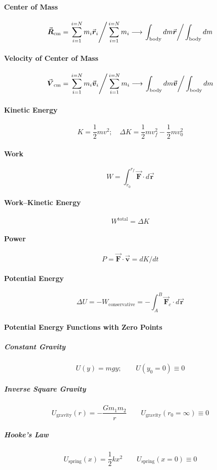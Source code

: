\documentclass{article}
\let\oldvec=\vec
\renewcommand{\vec}[1]{\oldvec{\boldsymbol{#1}}}
\begin{document}
\begin{multicols}{2}
  \paragraph{Center of Mass}
    $$\vec R_\text{cm} = \left.\sum_{i = 1}^{i=N} m_i \vec r_i \right/ \sum_{i=1}^{i=N} m_i \longrightarrow \left. \int_\text{body} dm\vec r \right/ \int_\text{body} dm$$
   
  \paragraph{Velocity of Center of Mass}
    $$\vec V_\text{cm} = \left.\sum_{i = 1}^{i=N} m_i \vec v_i \right/ \sum_{i=1}^{i=N} m_i \longrightarrow \left. \int_\text{body} dm\vec v \right/ \int_\text{body} dm$$
    
  \paragraph{Kinetic Energy}
    $$K = \frac12 m v^2; \quad \Delta K = \frac12 m v_f^2 - \frac12 m v_0^2$$
    
  \paragraph{Work}
    $$W = \int_{r_0}^{r_f} \vec F \cdot d\vec r$$
  
  \paragraph{Work--Kinetic Energy}
    $$W^\text{total} = \Delta K$$
    
  \paragraph{Power}
    $$P = \vec F \cdot \vec v = dK / dt$$
    
  \paragraph{Potential Energy}
    $$\Delta U = -W_\text{conservative} = -\int_A^B \vec F_c \cdot d\vec r$$
    
  \paragraph{Potential Energy Functions with Zero Points}
    \subparagraph{Constant Gravity}
      $$U(y) = mgy; \qquad U(y_0 = 0) \equiv 0$$
    \subparagraph{Inverse Square Gravity}
      $$U_\text{gravity}(r) = -\frac{Gm_1 m_2}{r}\qquad U_\text{gravity}(r_0 = \infty) \equiv 0$$
    \subparagraph{Hooke's Law}
      $$U_\text{spring}(x) = \frac12 k x^2\qquad U_\text{spring}(x = 0) \equiv 0$$
\end{multicols}
\end{document}
